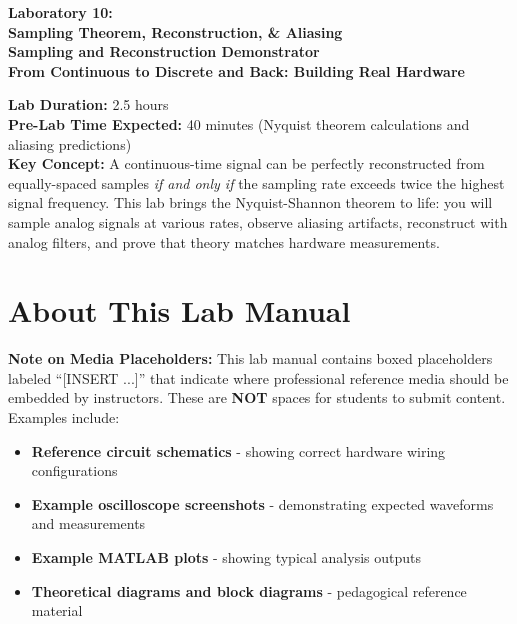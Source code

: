 \documentclass[11pt,letterpaper]{article}
\begin{document}
\begin{center}
\huge{\bf Laboratory 10:}\\
\vspace{0.2in}
\Large{\bf Sampling Theorem, Reconstruction, \& Aliasing}\\
\Large{\bf Sampling and Reconstruction Demonstrator}\\
\vspace{0.2in}
\normalsize{\bf From Continuous to Discrete and Back: Building Real Hardware}
\end{center}

\vspace{0.3in}
\noindent
\textbf{Lab Duration:} 2.5 hours\\
\textbf{Pre-Lab Time Expected:} 40 minutes (Nyquist theorem calculations and aliasing predictions)\\
\textbf{Key Concept:} A continuous-time signal can be perfectly reconstructed from equally-spaced samples \textit{if and only if} the sampling rate exceeds twice the highest signal frequency. This lab brings the Nyquist-Shannon theorem to life: you will sample analog signals at various rates, observe aliasing artifacts, reconstruct with analog filters, and prove that theory matches hardware measurements.

\tableofcontents
\clearpage

\section*{About This Lab Manual}

\textbf{Note on Media Placeholders:} This lab manual contains boxed placeholders labeled ``[INSERT ...]'' that indicate where professional reference media should be embedded by instructors. These are \textbf{NOT} spaces for students to submit content. Examples include:

\begin{itemize}
    \item \textbf{Reference circuit schematics} - showing correct hardware wiring configurations
    \item \textbf{Example oscilloscope screenshots} - demonstrating expected waveforms and measurements
    \item \textbf{Example MATLAB plots} - showing typical analysis outputs
    \item \textbf{Theoretical diagrams and block diagrams} - pedagogical reference material
\end{itemize}
\end{document}
